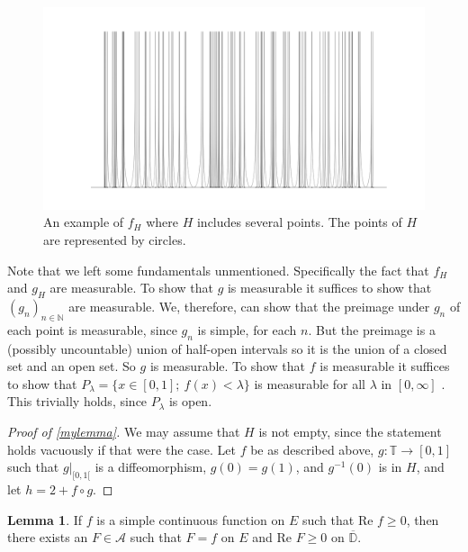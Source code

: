 \documentclass[a4paper,12pt,twoside,BCOR=10mm]{scrbook}
\theoremstyle{definition}
\theoremstyle{definition}
\newtheorem{lemma}[theorem]{Lemma}
\theoremstyle{definition}
\renewcommand{\Re}{\text{Re }}
\begin{document}
\begin{figure}[h]
\centering
\includegraphics[width=1\textwidth]{graph101}
\caption{An example of $f_H$ where $H$ includes several points. The points of $H$ are represented by circles. }
\end{figure}
Note that we left some fundamentals unmentioned.
Specifically the fact that $f_H$ and $g_H$ are measurable.
To show that $g$ is measurable it suffices to show that $(g_n)_{n \in \mathbb{N}}$ are measurable.
We, therefore, can show that the preimage under $g_n$ of each point is measurable, since $g_n$ is simple, for each $n$.
But the preimage is a (possibly uncountable) union of half-open intervals so it is the union of a closed set and an open set.
So $g$ is measurable.
To show that $f$ is measurable it suffices to show that $P_{\lambda} = \{x \in [0, 1];\ f(x) < \lambda\}$ is measurable for all $\lambda$ in $[0, \infty]$ \citep[lemma $1.3.9$]{tao}.
This trivially holds, since $P_{\lambda}$ is open.
\begin{proof}[Proof of \ref{mylemma}]
We may assume that $H$ is not empty, since the statement holds vacuously if that were the case.
Let $f$ be as described above,
	$g: \mathbb{T} \rightarrow [0, 1]$ such that $g|_{[0, 1[}$ is a diffeomorphism, $g(0) = g(1)$, and $g^{-1}(0)$ is in $H$,
	and let $h = 2 + f \circ g$.
\end{proof}
\begin{lemma}
\label{rudinlemma1}
If $f$ is a simple continuous function on $E$ such that $\Re f \geq 0$, then there exists an $F \in \mathcal{A}$ such that $F = f$ on $E$ and $\Re F \geq 0$ on $\overline{\mathbb{D}}$.
\end{lemma}
\end{document}
